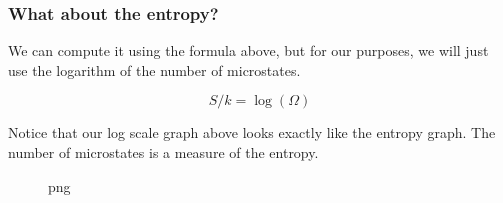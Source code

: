 \subsubsection{What about the entropy?}\label{what-about-the-entropy}

We can compute it using the formula above, but for our purposes, we will
just use the logarithm of the number of microstates.

\[S/k = \log(\Omega)\]

Notice that our log scale graph above looks exactly like the entropy
graph. The number of microstates is a measure of the entropy.

\begin{Shaded}
\begin{Highlighting}[]
\OperatorTok{=}
\OperatorTok{=}\OperatorTok{=}\StringTok{\textquotesingle{}{-}\textquotesingle{}}\OperatorTok{=}\NormalTok{)}
\NormalTok{)}
\NormalTok{)}
\NormalTok{plt.xticks(quanta\_values[::}\NormalTok{])}
\end{Highlighting}
\end{Shaded}

\begin{figure}
\centering
{}
\caption{png}
\end{figure}

